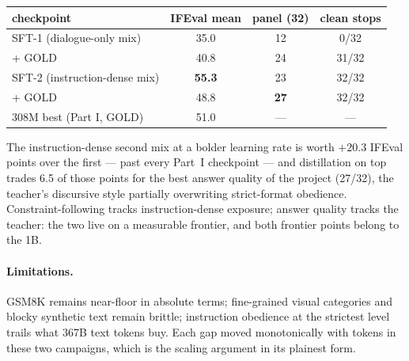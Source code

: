 \begin{center}
\begin{tabular}{lccc}
\toprule
checkpoint & IFEval mean & panel (32) & clean stops \\
\midrule
SFT-1 (dialogue-only mix) & 35.0 & 12 & 0/32 \\
\; + GOLD & 40.8 & 24 & 31/32 \\
SFT-2 (instruction-dense mix) & \textbf{55.3} & 23 & 32/32 \\
\; + GOLD & 48.8 & \textbf{27} & 32/32 \\
\midrule
308M best (Part I, GOLD) & 51.0 & --- & --- \\
\bottomrule
\end{tabular}
\end{center}

The instruction-dense second mix at a bolder learning rate is worth
$+20.3$ IFEval points over the first --- past every Part~I checkpoint
--- and distillation on top trades 6.5 of those points for the best
answer quality of the project (27/32), the teacher's discursive style
partially overwriting strict-format obedience. Constraint-following
tracks instruction-dense exposure; answer quality tracks the teacher:
the two live on a measurable frontier, and both frontier points belong
to the 1B.

\paragraph{Limitations.} GSM8K remains near-floor in absolute terms;
fine-grained visual categories and blocky synthetic text remain
brittle; instruction obedience at the strictest level trails what 367B
text tokens buy. Each gap moved monotonically with tokens in these
two campaigns, which is the scaling argument in its plainest form.
